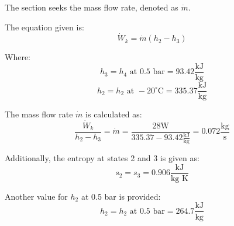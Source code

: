 The section seeks the mass flow rate, denoted as \( \dot{m} \).

The equation given is:
\[ \dot{W}_k = \dot{m} (h_2 - h_3) \]

Where:
\[ h_3 = h_4 \text{ at } 0.5 \text{ bar} = 93.42 \frac{\text{kJ}}{\text{kg}} \]
\[ h_2 = h_2 \text{ at } -20^\circ \text{C} = 335.37 \frac{\text{kJ}}{\text{kg}} \]

The mass flow rate \( \dot{m} \) is calculated as:
\[ \frac{\dot{W}_k}{h_2 - h_3} = \dot{m} = \frac{28 \text{W}}{335.37 - 93.42 \frac{\text{kJ}}{\text{kg}}} = 0.072 \frac{\text{kg}}{\text{s}} \]

Additionally, the entropy at states 2 and 3 is given as:
\[ s_2 = s_3 = 0.906 \frac{\text{kJ}}{\text{kg K}} \]

Another value for \( h_2 \) at 0.5 bar is provided:
\[ h_2 = h_2 \text{ at } 0.5 \text{ bar} = 264.7 \frac{\text{kJ}}{\text{kg}} \]